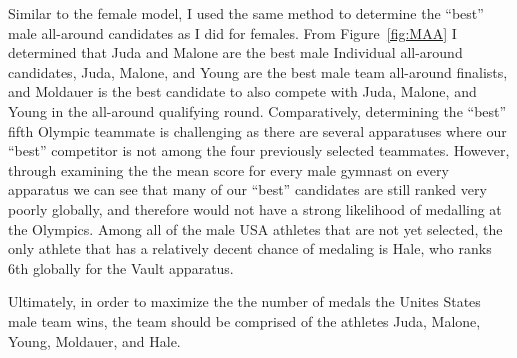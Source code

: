 \documentclass[12pt]{article}
\begin{document}
Similar to the female model, I used the same method to determine the ``best'' male all-around candidates as I did for females. From 
Figure~\ref{fig:MAA} I determined that Juda and Malone are the best male Individual all-around candidates, 
Juda, Malone, and Young are the best male team all-around finalists, and Moldauer is the best candidate to also compete 
with Juda, Malone, and Young in the all-around qualifying round. Comparatively, determining the ``best'' fifth Olympic 
teammate is challenging as there are several apparatuses where our ``best'' competitor is not among the four 
previously selected teammates. However, through examining the the mean score for every male gymnast on every apparatus 
we can see that many of our ``best'' candidates are still ranked very poorly globally, and therefore would not have a 
strong likelihood of medalling at the Olympics. Among all of the male USA athletes that are not yet selected, the only 
athlete that has a relatively decent chance of medaling is Hale, who ranks 6th globally for the Vault apparatus.

Ultimately, in order to maximize the the number of medals the Unites States male team wins, the team should be comprised  
of the athletes Juda, Malone, Young, Moldauer, and Hale.



\end{document}
